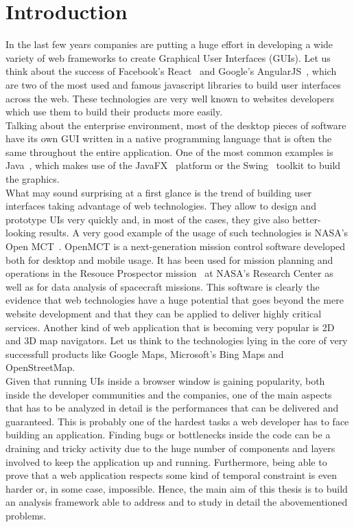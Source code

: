 \chapter{Introduction} \label{cha:intro}

In the last few years companies are putting a huge effort in developing a wide variety of 
web frameworks to create Graphical User Interfaces (GUIs). Let us think about the success of Facebook's
React~\cite{fbreact} and Google's AngularJS~\cite{angularjs}, which are two of the most
used and famous javascript libraries to build user interfaces across the web.
These technologies are very well known to websites developers which use them to
build their products more easily.\\
Talking about the enterprise environment, most of the desktop pieces of software have its own GUI
written in a native programming language that is often the same throughout the entire application.
One of the most common examples is Java~\cite{gosling1995java}, which makes use of the JavaFX~\cite{javafx}
platform or the Swing~\cite{javaswing} toolkit to build the graphics.\\
What may sound surprising at a first glance is the trend of building user interfaces taking
advantage of web technologies. They allow to design and prototype UIs very quickly and, in
most of the cases, they give also better-looking results.
A very good example of the usage of such technologies is NASA's Open MCT~\cite{openmct}.
OpenMCT is a next-generation mission control software developed both for desktop and mobile
usage. It has been used for mission planning and operations in the Resouce 
Prospector mission~\cite{andrews2014introducing} at NASA's Research Center as well as for
data analysis of spacecraft missions. This software is clearly the evidence that web
technologies have a huge potential that goes beyond the mere website development and that they 
can be applied to deliver highly critical services.
Another kind of web application that is becoming very popular is 2D and 3D map navigators.
Let us think to the technologies lying in the core of very successfull products like
Google Maps, Microsoft's Bing Maps and OpenStreetMap.\\
Given that running UIs inside a browser window is gaining popularity, both inside the
developer communities and the companies, one of the main aspects that has to be analyzed
in detail is the performances that can be delivered and guaranteed. This is probably one of
the hardest tasks a web developer has to face building an application. Finding bugs
or bottlenecks inside the code can be a draining and tricky activity due to the huge number
of components and layers involved to keep the application up and running. Furthermore,
being able to prove that a web application respects some kind of temporal constraint
is even harder or, in some case, impossible. Hence, the main aim of this thesis is
to build an analysis framework able to address and to study in detail the
abovementioned problems.

